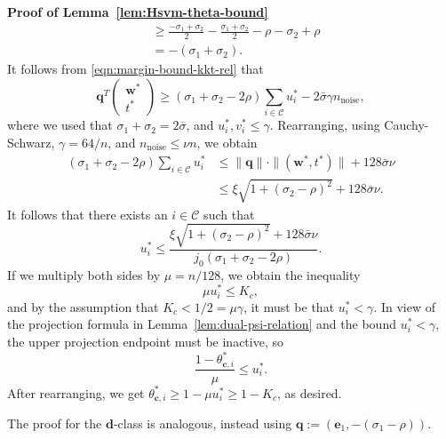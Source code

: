 \documentclass[twoside,11pt]{article}
\renewcommand{\c}{\bm{c}}
\renewcommand{\d}{\bm{d}}
\newcommand\q{\bm{q}}
\newcommand\w{\bm{w}}
\newcommand\e{\bm{e}}
\newcommand\CC{\mathcal{C}}
\newenvironment{proofof}[1]
  {\par\noindent\textbf{Proof of #1}\enspace\ignorespaces}
  {\hfill\BlackBox\\[2mm]}
\begin{document}
\begin{proofof}{Lemma~\ref{lem:Hsvm-theta-bound}}
\begin{align*}
                      &\geq \frac{-\sigma_1 + \sigma_2}{2} - \frac{\sigma_1 + \sigma_2}{2} - \rho - \sigma_2 + \rho\\
                      &= -(\sigma_1 + \sigma_2).
    \end{align*}
    It follows from \eqref{eqn:margin-bound-kkt-rel} that
    \[
        \q^T\begin{pmatrix}
            \w^*\\
            t^*
        \end{pmatrix} \geq (\sigma_1 + \sigma_2 - 2\rho)\sum_{i \in \CC}u_i^* - 2\bar{\sigma}\gamma n_{\text{noise}},
    \]
    where we used that $\sigma_1 + \sigma_2 = 2\bar{\sigma}$, and $u_i^*, v_i^* \leq \gamma$. Rearranging, using Cauchy-Schwarz, $\gamma = 64/n$, and $n_{\text{noise}} \leq \nu n$, we obtain
    \begin{align*}
        (\sigma_1 + \sigma_2 - 2\rho)\sum_{i \in \CC}u_i^* &\leq \|\q\|\cdot \|(\w^*,t^*)\| + 128\bar{\sigma}\nu\\
        &\leq \xi\sqrt{1 + (\sigma_2 - \rho)^2} + 128\bar{\sigma}\nu.
    \end{align*}
    It follows that there exists an $i \in \CC$ such that
    \[
        u_i^* \leq \frac{\xi\sqrt{1 + (\sigma_2 - \rho)^2} + 128\bar{\sigma}\nu}{j_0(\sigma_1 + \sigma_2 - 2\rho)}.
    \]
    If we multiply both sides by $\mu = n/128$, we obtain the inequality
    \[
        \mu u_i^* \leq K_c,
    \]
    and by the assumption that $K_c < 1/2 = \mu\gamma$, it must be that $u_i^* < \gamma$. In view of the projection formula in Lemma~\ref{lem:dual-psi-relation} and the bound $u_i^* < \gamma$, the upper projection endpoint must be inactive, so
    \[
        \frac{1-\theta_{\c,i}^*}{\mu} \leq u_i^*.
    \]
    After rearranging, we get $\theta_{\c,i}^* \geq 1 - \mu u_i^* \geq 1 - K_c$, as desired.

    The proof for the $\d$-class is analogous, instead using $\q := (\e_1,-(\sigma_1 - \rho))$.
\end{proofof}
\end{document}
